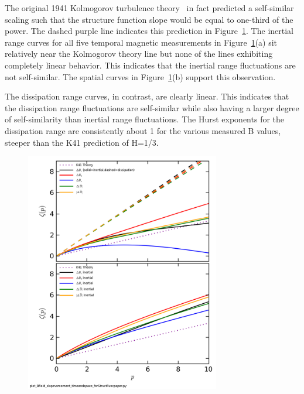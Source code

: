 \documentclass[aps,prl,amsmath,amssymb,reprint,superscriptaddress]{revtex4-1} %
\begin{document}
The original 1941 Kolmogorov turbulence theory~\cite{kolmogorov41} in fact predicted a self-similar scaling such that the structure function slope would be equal to one-third of the power. The dashed purple line indicates this prediction in Figure~\ref{fig:slopevsmom}. The inertial range curves for all five temporal magnetic measurements in Figure~\ref{fig:slopevsmom}(a) sit relatively near the Kolmogorov theory line but none of the lines exhibiting completely linear behavior. This indicates that the inertial range fluctuations are not self-similar. The spatial curves in Figure~\ref{fig:slopevsmom}(b) support this observation.

The dissipation range curves, in contrast, are clearly linear. This indicates that the dissipation range fluctuations are self-similar while also having a larger degree of self-similarity than inertial range fluctuations. The Hurst exponents for the dissipation range are consistently about 1 for the various measured B values, steeper than the K41 prediction of H=1/3.




\begin{figure}[!htbp]
\centerline{
\includegraphics[width=8.5cm]{Bfield_StructureFunctionSlope_vs_Moment_timeandspace_100313Shots41to80_forStructFuncpaper.png}}
\caption{\label{fig:slopevsmom} }
\end{figure}
\end{document}
